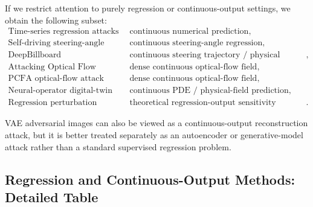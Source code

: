 \documentclass{article}
\begin{document}
If we restrict attention to purely regression or continuous-output settings, we obtain the following subset:
\[
\begin{array}{ll}
\text{Time-series regression attacks} 
& \text{continuous numerical prediction}, \\[1mm]
\text{Self-driving steering-angle attacks} 
& \text{continuous steering-angle regression}, \\[1mm]
\text{DeepBillboard} 
& \text{continuous steering trajectory / physical driving control}, \\[1mm]
\text{Attacking Optical Flow} 
& \text{dense continuous optical-flow field}, \\[1mm]
\text{PCFA optical-flow attack} 
& \text{dense continuous optical-flow field}, \\[1mm]
\text{Neural-operator digital-twin attack} 
& \text{continuous PDE / physical-field prediction}, \\[1mm]
\text{Regression perturbation theory} 
& \text{theoretical regression-output sensitivity analysis}.
\end{array}
\]

VAE adversarial images can also be viewed as a continuous-output reconstruction attack, but it is better treated separately as an autoencoder or generative-model attack rather than a standard supervised regression problem.

\subsection{Regression and Continuous-Output Methods: Detailed Table}
\end{document}
